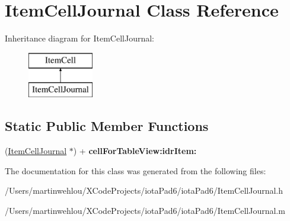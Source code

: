 \hypertarget{interface_item_cell_journal}{
\section{ItemCellJournal Class Reference}
\label{interface_item_cell_journal}
}
Inheritance diagram for ItemCellJournal:\begin{figure}[H]
\begin{center}
\leavevmode
\includegraphics[height=2.000000cm]{interface_item_cell_journal}
\end{center}
\end{figure}
\subsection*{Static Public Member Functions}
\begin{DoxyCompactItemize}
\item 
\hypertarget{interface_item_cell_journal_a04e6ebd33f74936aae8110b4595b7563}{
(\hyperlink{interface_item_cell_journal}{ItemCellJournal} $\ast$) + {\bfseries cellForTableView:idrItem:}}
\label{interface_item_cell_journal_a04e6ebd33f74936aae8110b4595b7563}

\end{DoxyCompactItemize}


The documentation for this class was generated from the following files:\begin{DoxyCompactItemize}
\item 
/Users/martinwehlou/XCodeProjects/iotaPad6/iotaPad6/ItemCellJournal.h\item 
/Users/martinwehlou/XCodeProjects/iotaPad6/iotaPad6/ItemCellJournal.m\end{DoxyCompactItemize}
